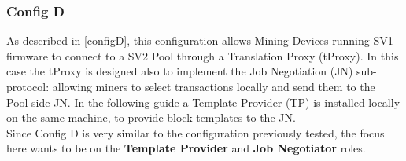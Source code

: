 \subsubsection{Config D}
As described in \ref{configD}, this configuration allows Mining Devices running SV1 firmware to connect to a SV2 Pool through a Translation Proxy (tProxy). In this case the tProxy is designed also to implement the Job Negotiation (JN) sub-protocol: allowing miners to select transactions locally and send them to the Pool-side JN. In the following guide a Template Provider (TP) is installed locally on the same machine, to provide block templates to the JN.\\
Since Config D is very similar to the configuration previously tested, the focus here wants to be on the \textbf{Template Provider} and \textbf{Job Negotiator} roles. \\

